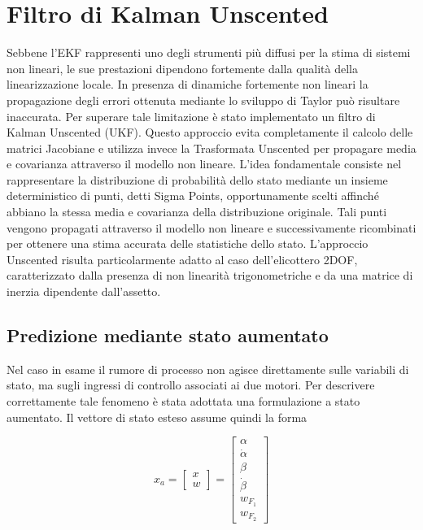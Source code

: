 \documentclass[12pt,a4paper]{article}
\begin{document}
\section{Filtro di Kalman Unscented}
Sebbene l'EKF rappresenti uno degli strumenti più diffusi per la stima di sistemi non lineari, le sue prestazioni dipendono fortemente dalla qualità della linearizzazione locale. In presenza di dinamiche fortemente non lineari la propagazione degli errori ottenuta mediante lo sviluppo di Taylor può risultare inaccurata.
Per superare tale limitazione è stato implementato un filtro di Kalman Unscented (UKF). Questo approccio evita completamente il calcolo delle matrici Jacobiane e utilizza invece la Trasformata Unscented per propagare media e covarianza attraverso il modello non lineare.
L'idea fondamentale consiste nel rappresentare la distribuzione di probabilità dello stato mediante un insieme deterministico di punti, detti Sigma Points, opportunamente scelti affinché abbiano la stessa media e covarianza della distribuzione originale.
Tali punti vengono propagati attraverso il modello non lineare e successivamente ricombinati per ottenere una stima accurata delle statistiche dello stato.
L'approccio Unscented risulta particolarmente adatto al caso dell'elicottero 2DOF, caratterizzato dalla presenza di non linearità trigonometriche e da una matrice di inerzia dipendente dall'assetto.


\subsection{Predizione mediante stato aumentato}
Nel caso in esame il rumore di processo non agisce direttamente sulle variabili di stato, ma sugli ingressi di controllo associati ai due motori.
Per descrivere correttamente tale fenomeno è stata adottata una formulazione a stato aumentato.
Il vettore di stato esteso assume quindi la forma

\begin{equation}
x_a =
\begin{bmatrix}
x \\
w
\end{bmatrix}
=
\begin{bmatrix}
\alpha \\
\dot{\alpha} \\
\beta \\
\dot{\beta} \\
w_{F_1} \\
w_{F_2}
\end{bmatrix}
\end{equation}
\end{document}
